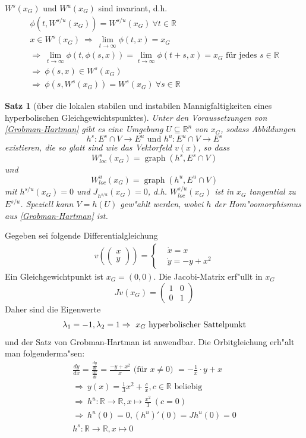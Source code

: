 \documentclass[a4paper, 13pt]{scrreprt}
\newtheorem{satz}{Satz}[section]
\theoremstyle{definition} \newtheorem{definition}{Definition}[section]
\newenvironment{beispiel}[1][Beispiel]{\begin{trivlist}
\item[\hskip \labelsep {\bfseries #1}]}{\end{trivlist}}
\newenvironment{bemerkung}[1][Bemerkung]{\begin{trivlist}
\item[\hskip \labelsep {\bfseries #1}]}{\end{trivlist}}
\newcommand{\RR}{\mathbb{R}}
\begin{document}
\begin{bemerkung}
$W^s(x_G)$ und $W^u(x_G)$ sind invariant, d.h.
\begin{align*}
\phi(t,W^{s/u}(x_G))=W^{s/u}(x_G)\ \forall t\in\mathbb{R} \\
x\in W^s(x_G)\ \Rightarrow\ \lim_{t\to\infty}\phi(t,x)=x_G\\
\Rightarrow\ \lim_{t\to\infty}\phi(t,\phi(s,x))=\lim_{t\to\infty}\phi(t+s,x)=x_G \text{ für jedes }  s\in\mathbb{R}\\
\Rightarrow\ \phi(s,x)\in W^s(x_G)\\
\Rightarrow\ \phi(s,W^s(x_G))=W^s(x_G)\ \forall s\in\mathbb{R}
\end{align*}
\end{bemerkung}

\begin{satz}[über die lokalen stabilen und instabilen Mannigfaltigkeiten eines hyperbolischen Gleichgewichtspunktes]
Unter den Voraussetzungen von \eqref{Grobman-Hartman} gibt es eine Umgebung $U\subseteq \RR^n$ von $x_G$, sodass  Abbildungen
\[h^s:E^s\cap V\to E^u \text{ und } h^u:E^u\cap V\to E^s\]
existieren, die so glatt sind wie das Vektorfeld $v(x)$, so dass
\[W_{loc}^s(x_G)=\operatorname{graph}(h^s, E^s\cap V) \]und
\[W_{loc}^u(x_G)=\operatorname{graph}(h^u, E^u\cap V) \]
mit $h^{s/u}(x_G)=0$ und $J_{h^{s/u}}(x_G)=0$, d.h. $W_{loc}^{s/u}(x_G)$ ist in $x_G$ tangential zu $E^{s/u}$. Speziell kann $V = h(U)$ gew"ahlt werden, wobei $h$ der Hom"oomorphismus aus \eqref{Grobman-Hartman} ist.
\end{satz}

\begin{beispiel}
Gegeben sei folgende Differentialgleichung
\begin{align*}
v( \begin{pmatrix} x \\ y\end{pmatrix} ) = \begin{cases}
&\dot{x}=x\\
&\dot{y}=-y+x^2
\end{cases}
\end{align*}
Ein Gleichgewichtpunkt ist $x_G=(0,0)$. Die Jacobi-Matrix erf"ullt in $x_G$ 
\[Jv(x_G)=\begin{pmatrix} 1&0\\ 0&1 \end{pmatrix}\]
Daher sind die Eigenwerte 
\[ \lambda_1=-1, \lambda_2=1\\
\Rightarrow\ x_G  \text{ hyperbolischer Sattelpunkt}\]
und der Satz von Grobman-Hartman ist anwendbar. Die Orbitgleichung erh"alt man folgenderma"sen:
\begin{align*}
\frac{dy}{dx}=\frac{\frac{dy}{dt}}{\frac{dx}{dt}}=\frac{-y+x^2}{x} \text{ (für $x\neq 0$) } =-\frac 1 x \cdot y+x\\
\Rightarrow\ y(x)=\frac 1 3 x^2+\frac c x, c\in\mathbb{R} \text{ beliebig} \\
\Rightarrow\ h^u:\mathbb{R}\to\mathbb{R}, x\mapsto\frac{x^2} 3\ (c=0)\\
\Rightarrow\ h^u(0)=0, (h^u)'(0)=Jh^u(0)=0\\
h^s:\mathbb{R}\to\mathbb{R}, x\mapsto 0
\end{align*}
\end{beispiel}
\end{document}
